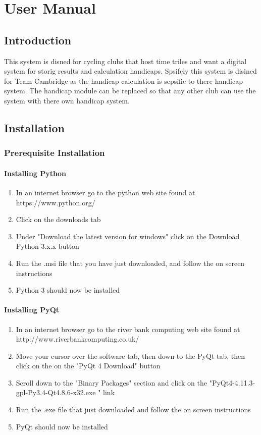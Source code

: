 \chapter{User Manual}

\section{Introduction}
This system is disned for cycling clubs that host time triles and want a digital system for storig results and calculation handicaps. Spsifcly this system is disined for Team Cambridge as the handicap calculation is sepsific to there handicap system. The handicap module can be replaced so that any other club can use the system with there own handicap system.
\section{Installation}

\subsection{Prerequisite Installation}

\subsubsection{Installing Python}
\begin{enumerate}
\item In an internet browser go to the python web site found at https://www.python.org/
\item Click on the downloads tab
\item Under "Download the latest version for windows" click on the Download Python 3.x.x button
\item Run the .msi file that you have just downloaded, and follow the on screen instructions
\item Python 3 should now be installed
\end{enumerate}
\subsubsection{Installing PyQt}
\begin{enumerate}
\item In an internet browser go to the river bank computing web site found at http://www.riverbankcomputing.co.uk/
\item Move your cursor over the software tab, then down to the PyQt tab, then click on the on the "PyQt 4 Download" button
\item Scroll down to the "Binary Packages" section and click on the "PyQt4-4.11.3-gpl-Py3.4-Qt4.8.6-x32.exe	" link
\item Run the .exe file that just downloaded and follow the on screen instructions
\item PyQt should now be installed
\end{enumerate}
